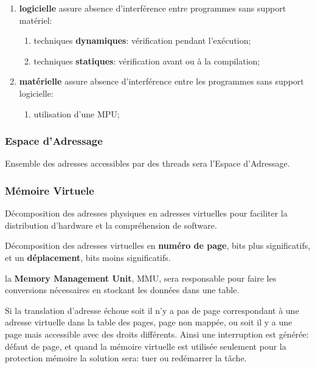 \documentclass{article}
\begin{document}
\begin{definition}
\begin{enumerate}[rightmargin = \leftmargin]
        \item \textbf{logicielle} assure absence d'interférence entre programmes sans support matériel:
        \begin{enumerate}
            \item techniques \textbf{dynamiques}: vérification pendant l'exécution;
            \item techniques \textbf{statiques}: vérification avant ou à la compilation;
        \end{enumerate}

        \item \textbf{matérielle} assure absence d'interférence entre les programmes sans support logicielle:
        \begin{enumerate}
            \item utilisation d'une MPU;
        \end{enumerate}
    \end{enumerate}
\end{definition}

\subsubsection{Espace d'Adressage}
\begin{definition}
    Ensemble des adresses accessibles par des threads sera l'Espace d'Adressage.
\end{definition}

\subsubsection{Mémoire Virtuele}
\begin{definition}
    Décomposition des adresses physiques en adresses virtuelles pour faciliter la distribution d'hardware et la compréhension de software.

    \begin{remark}
        Décomposition des adresses virtuelles en \textbf{numéro de page}, bits plus significatifs, et un \textbf{déplacement}, bits moins significatifs.
    \end{remark}

    \begin{remark}
        la \textbf{Memory Management Unit}, MMU, sera responsable pour faire les conversions nécessaires en stockant les données dans une table.
    \end{remark}
    Si la translation d'adresse échoue soit il n'y a pas de page correspondant à une adresse virtuelle dans la table des pages, page non mappée, ou soit il y a une page mais accessible avec des droits différents. Ainsi une interruption est générée: défaut de page, et quand la mémoire virtuelle est utilisée seulement pour la protection mémoire la solution sera: tuer ou redémarrer la tâche.
\end{definition}
\end{document}
